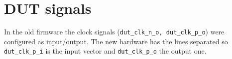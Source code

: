 \chapter{DUT signals}\label{ch:DUTsignals}
In the old firmware the clock signals (\verb|dut_clk_n_o, dut_clk_p_o|) were configured as input/output. The new hardware has the lines separated so \verb|dut_clk_p_i| is the input vector and \verb|dut_clk_p_o| the output one.\\ 